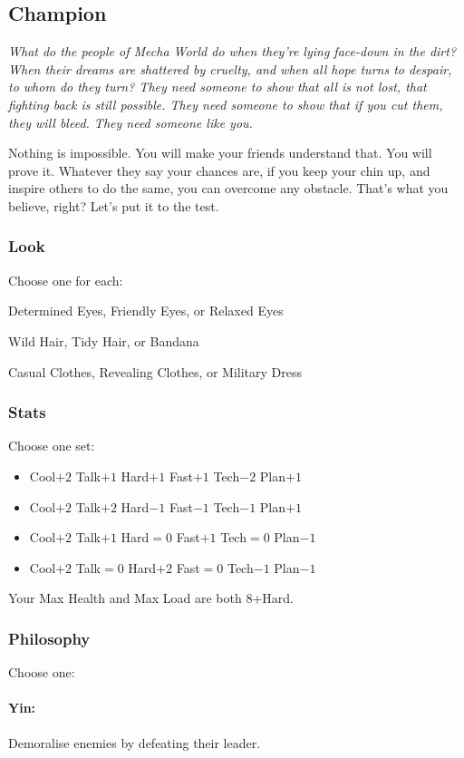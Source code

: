 \subsection{Champion}

{\itshape What do the people of Mecha World do when they're lying
  face-down in the dirt? When their dreams are shattered by cruelty,
  and when all hope turns to despair, to whom do they turn? They need
  someone to show that all is not lost, that fighting back is still
  possible. They need someone to show that if you cut them, they
  \emph{will} bleed. They need someone like you.

Nothing is impossible. You will make your friends understand that. You
will prove it. Whatever they say your chances are, if you keep your
chin up, and inspire others to do the same, you can overcome any
obstacle. That's what you believe, right? Let's put it to the test.}

\subsubsection{Look}
Choose one for each:

Determined Eyes, Friendly Eyes, or Relaxed Eyes

Wild Hair, Tidy Hair, or Bandana

Casual Clothes, Revealing Clothes, or Military Dress

\subsubsection{Stats}
Choose one set:
\begin{itemize}
\setlength\itemsep{0em}
\item Cool$+2$ Talk$+1$ Hard$+1$ Fast$+1$ Tech$-2$ Plan$+1$
\item Cool$+2$ Talk$+2$ Hard$-1$ Fast$-1$ Tech$-1$ Plan$+1$
\item Cool$+2$ Talk$+1$ Hard${=}0$ Fast$+1$ Tech${=}0$ Plan$-1$
\item Cool$+2$ Talk${=}0$ Hard$+2$ Fast${=}0$ Tech$-1$ Plan$-1$
\end{itemize}

Your Max Health and Max Load are both 8+Hard.

\subsubsection{Philosophy}
Choose one:
\paragraph{Yin:} Demoralise enemies by defeating their leader.
